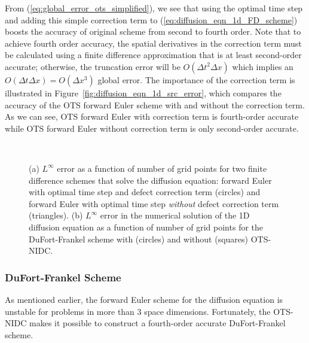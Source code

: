 \documentclass[fleqn,12pt,twoside]{article}
\def\dt{\Delta t}
\def\dx{\Delta x}
\begin{document}
From (\ref{eq:global_error_ots_simplified}), we see that using the optimal 
time step and adding this simple correction term to 
(\ref{eq:diffusion_eqn_1d_FD_scheme}) boosts the accuracy of original scheme 
from second to fourth order.  Note that to achieve fourth order accuracy, 
the spatial derivatives in the correction term must be calculated using a
finite difference approximation that is at least second-order accurate; 
otherwise, the truncation error will be $O(\dt^2 \dx)$ which implies an 
$O(\dt \dx) = O(\dx^3)$ global error. 
The importance of the correction term is illustrated in 
Figure~\ref{fig:diffusion_eqn_1d_src_error}, which compares the accuracy of 
the OTS forward Euler scheme with and without the correction term.  As we 
can see, OTS forward Euler with correction term is fourth-order accurate 
while OTS forward Euler without correction term is only second-order 
accurate.  

\begin{figure}[tb]
\begin{center}
\ \ \ \ \ \ \ 
\caption{(a) $L^\infty$ error as a function of number of grid points for 
two finite difference schemes that solve the diffusion equation: 
forward Euler with optimal time step and defect correction term (circles) and 
forward Euler with optimal time step \emph{without} defect correction term 
(triangles).  
(b) $L^\infty$ error in the numerical solution of the 1D diffusion 
equation as a function of number of grid points for the DuFort-Frankel scheme 
with (circles) and without (squares) OTS-NIDC.
}
\end{center}
\end{figure}


\subsubsection{DuFort-Frankel Scheme \label{sec:dufort_frankel}}
As mentioned earlier, the forward Euler scheme for the diffusion equation is
unstable for problems in more than 3 space dimensions.  Fortunately, the 
OTS-NIDC makes it possible to construct a fourth-order accurate 
DuFort-Frankel scheme. 
\end{document}
